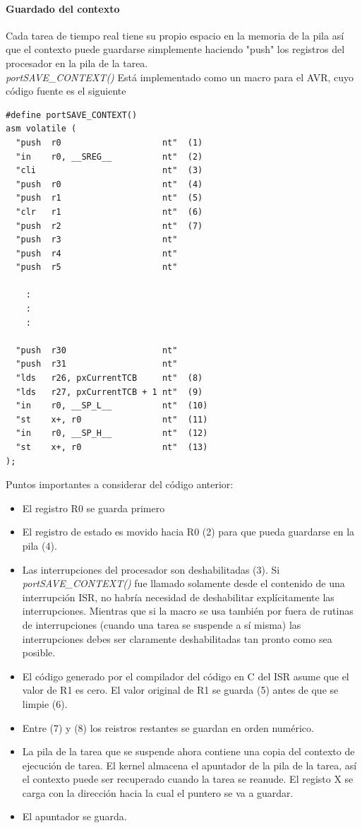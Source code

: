 \paragraph{Guardado del contexto}

Cada tarea de tiempo real tiene su propio espacio en la memoria de la pila así que el contexto puede guardarse simplemente haciendo "push" los registros del procesador en la pila de la tarea. \\

 \textit{portSAVE\_CONTEXT()} Está implementado como un macro para el AVR, cuyo código fuente es el siguiente
 
 \begin{verbatim}
#define portSAVE_CONTEXT()           
asm volatile (	                     
  "push  r0                    nt"  (1)
  "in    r0, __SREG__          nt"  (2)
  "cli                         nt"  (3)
  "push  r0                    nt"  (4)
  "push  r1                    nt"  (5)
  "clr   r1                    nt"  (6)
  "push  r2                    nt"  (7)
  "push  r3                    nt" 
  "push  r4                    nt" 
  "push  r5                    nt" 

    :
    :
    :

  "push  r30                   nt" 
  "push  r31                   nt" 
  "lds   r26, pxCurrentTCB     nt"  (8)
  "lds   r27, pxCurrentTCB + 1 nt"  (9)
  "in    r0, __SP_L__          nt"  (10)
  "st    x+, r0                nt"  (11)
  "in    r0, __SP_H__          nt"  (12)
  "st    x+, r0                nt"  (13)
);
 \end{verbatim}

Puntos importantes a considerar del código anterior:

\begin{itemize}
    \item El registro R0 se guarda primero
    \item El registro de estado es movido hacia R0 (2) para que pueda guardarse en la pila (4).
    \item Las interrupciones del procesador son deshabilitadas (3). Si \textit{portSAVE\_CONTEXT()} fue llamado solamente desde el contenido de una interrupción ISR, no habría necesidad de deshabilitar explícitamente las interrupciones. Mientras que si la macro se usa también por fuera de rutinas de interrupciones (cuando una tarea se suspende a sí misma) las interrupciones debes ser claramente deshabilitadas tan pronto como sea posible.
    \item El código generado por el compilador del código en C del ISR asume que el valor de R1 es cero. El valor original de R1 se guarda (5) antes de que se limpie (6).
    \item Entre (7) y (8) los reistros restantes se guardan en orden numérico.
    \item La pila de la tarea que se suspende ahora contiene una copia del contexto de ejecución de tarea. El kernel almacena el apuntador de la pila de la tarea, así el contexto puede ser recuperado cuando la tarea se reanude. El registo X se carga con la dirección hacia la cual el puntero se va a guardar. 
    \item El apuntador se guarda.
\end{itemize}

